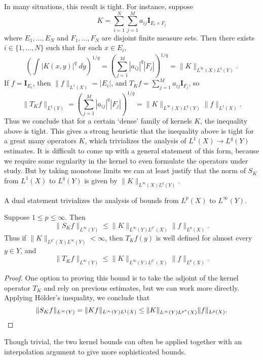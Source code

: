 \begin{remark}
  In many situations, this result is tight. For instance, suppose
  \[ K = \sum_{i = 1}^N \sum_{j = 1}^M a_{ij} \mathbf{I}_{E_i \times F_j} \]
  where $E_1,\dots,E_N$ and $F_1,\dots,F_N$ are disjoint finite measure sets. Then there exists $i \in \{ 1, \dots, N \}$ such that for each $x \in E_i$,
  \[ \left( \int |K(x,y)|^q\; dy \right)^{1/q} = \left( \sum_{j = 1}^M |a_{ij}|^q |F_j| \right)^{1/q} = \| K \|_{L^\infty(X) L^q(Y)}. \]
  If $f = \mathbf{I}_{E_i}$, then $\| f \|_{L^1(X)} = |E_i|$, and $T_K f = \sum_{j = 1}^M a_{ij} \mathbf{I}_{F_j}$, so
  \[ \| T_K f \|_{L^q(Y)} = \left( \sum_{j = 1}^M |a_{ij}|^q |F_j| \right)^{1/q} = \| K \|_{L^\infty(X) L^q(Y)} \| f \|_{L^1(X)}. \]
  Thus we conclude that for a certain `dense' family of kernels $K$, the inequality above is tight. This gives a strong heuristic that the inequality above is tight for a great many operators $K$, which trivializes the analysis of $L^1(X) \to L^q(Y)$ estimates. It is difficult to come up with a general statement of this form, because we require some regularity in the kernel to even formulate the operators under study. But by taking monotone limits we can at least justify that the norm of $S_K$ from $L^1(X)$ to $L^q(Y)$ is given by $\| K \|_{L^\infty(X) L^q(Y)}$.
\end{remark}

A dual statement trivializes the analysis of bounds from $L^p(X)$ to $L^\infty(Y)$.

\begin{theorem}
  Suppose $1 \leq p \leq \infty$. Then
  \[ \| S_K f \|_{L^\infty(Y)} \leq \| K \|_{L^\infty(Y) L^{p^*}(X)} \| f \|_{L^p(X)}. \]
  Thus if $\| K \|_{L^{p^*}(X) L^\infty(Y)} < \infty$, then $T_K f(y)$ is well defined for almost every $y \in Y$, and
  \[ \| T_K f \|_{L^\infty(Y)} \leq \| K \|_{L^\infty(Y) L^{p^*}(X)} \| f \|_{L^p(X)}. \]
\end{theorem}
\begin{proof}
  One option to proving this bound is to take the adjoint of the kernel operator $T_K$ and rely on previous estimates, but we can work more directly. Applying H\"{o}lder's inequality, we conclude that
  \[ \| S_K f \|_{L^\infty(Y)} = \| K f \|_{L^\infty(Y) L^1(X)} \leq \| K \|_{L^\infty(Y) L^{p^*}(X)} \| f \|_{L^p(X)}. \qedhere \]
\end{proof}

Though trivial, the two kernel bounds can often be applied together with an interpolation argument to give more sophisticated bounds.

